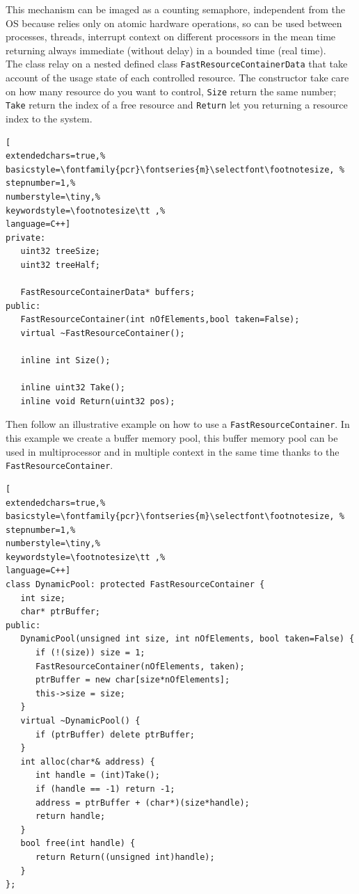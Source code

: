 This mechanism can be imaged as a counting semaphore, independent from the OS because relies only on atomic hardware operations, so can be used between processes, threads, interrupt context on different processors in the mean time returning always immediate (without delay) in a bounded time (real time). \\


The class relay on a nested defined class \texttt{FastResourceContainerData} that take account of the usage state of each controlled resource.
The constructor take care on how many resource do you want to control, \texttt{Size} return the same number; \texttt{Take} return the index of a free resource and \texttt{Return} let you returning a resource index to the system.

\begin{lstlisting}[
extendedchars=true,%
basicstyle=\fontfamily{pcr}\fontseries{m}\selectfont\footnotesize, %
stepnumber=1,%
numberstyle=\tiny,%
keywordstyle=\footnotesize\tt ,%
language=C++]
private:
   uint32 treeSize;
   uint32 treeHalf;

   FastResourceContainerData* buffers;
public:
   FastResourceContainer(int nOfElements,bool taken=False);
   virtual ~FastResourceContainer();

   inline int Size();

   inline uint32 Take();
   inline void Return(uint32 pos);
\end{lstlisting}

Then follow an illustrative example on how to use a \texttt{FastResourceContainer}. In this example we create a buffer memory pool, this buffer memory pool can be used in multiprocessor and in multiple context in the same time thanks to the \texttt{FastResourceContainer}.

\begin{lstlisting}[
extendedchars=true,%
basicstyle=\fontfamily{pcr}\fontseries{m}\selectfont\footnotesize, %
stepnumber=1,%
numberstyle=\tiny,%
keywordstyle=\footnotesize\tt ,%
language=C++]
class DynamicPool: protected FastResourceContainer {
   int size;
   char* ptrBuffer;
public:
   DynamicPool(unsigned int size, int nOfElements, bool taken=False) {
      if (!(size)) size = 1;
      FastResourceContainer(nOfElements, taken);
      ptrBuffer = new char[size*nOfElements];
      this->size = size;
   }
   virtual ~DynamicPool() {
      if (ptrBuffer) delete ptrBuffer;
   }
   int alloc(char*& address) {
      int handle = (int)Take();
      if (handle == -1) return -1;
      address = ptrBuffer + (char*)(size*handle);
      return handle;
   }
   bool free(int handle) {
      return Return((unsigned int)handle);
   }
};
\end{lstlisting}



